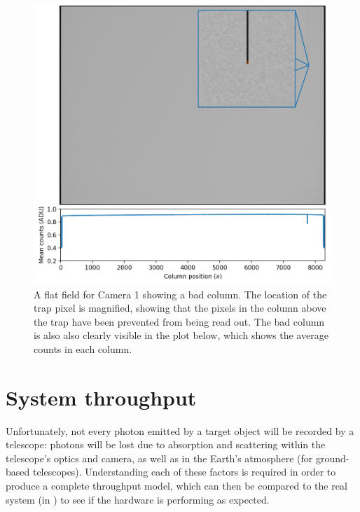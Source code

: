 \begin{colsection}
\begin{figure}[p]
    \begin{center}
        \includegraphics[width=\linewidth]{images/detectors/defect_plot.pdf}
    \end{center}
    \caption[An example of a column defect]{
        A flat field for Camera 1 showing a bad column. The location of the trap pixel is magnified, showing that the pixels in the column above the trap have been prevented from being read out. The bad column is also also clearly visible in the plot below, which shows the average counts in each column.
    }\label{fig:itsatrap}
\end{figure}

\clearpage

\end{colsection}


\section{System throughput}
\label{sec:throughput}


\begin{colsection}

Unfortunately, not every photon emitted by a target object will be recorded by a telescope: photons will be lost due to absorption and scattering within the telescope's optics and camera, as well as in the Earth's atmosphere (for ground-based telescopes). Understanding each of these factors is required in order to produce a complete throughput model, which can then be compared to the real system (in ) to see if the hardware is performing as expected.

\end{colsection}

